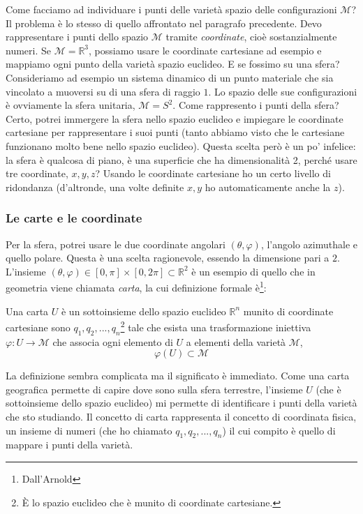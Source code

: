\documentclass[a4paper,openany]{article}
\begin{document}
	Come facciamo ad individuare i punti delle varietà spazio delle configurazioni $\mathcal{M}$? Il problema è lo stesso di quello affrontato nel paragrafo precedente. Devo rappresentare i punti dello spazio $\mathcal{M}$ tramite \textit{coordinate}, cioè sostanzialmente numeri. Se $\mathcal{M} = \mathbb{R}^3$, possiamo usare le coordinate cartesiane ad esempio e mappiamo ogni punto della varietà spazio euclideo. E se fossimo su una sfera? Consideriamo ad esempio un sistema dinamico di un punto materiale che sia vincolato a muoversi su di una sfera di raggio $1$. Lo spazio delle sue configurazioni è ovviamente la sfera unitaria, $\mathcal{M} = S^2$. Come rappresento i punti della sfera? Certo, potrei immergere la sfera nello spazio euclideo e impiegare le coordinate cartesiane per rappresentare i suoi punti (tanto abbiamo visto che le cartesiane funzionano molto bene nello spazio euclideo). Questa scelta però è un po' infelice: la sfera è qualcosa di piano, è una superficie che ha dimensionalità 2, perché usare tre coordinate, $x,y,z$? Usando le coordinate cartesiane ho un certo livello di ridondanza (d'altronde, una volte definite $x,y$ ho automaticamente anche la $z$).
	\subsubsection{Le carte e le coordinate}
	Per la sfera, potrei usare le due coordinate angolari $(\theta,\varphi)$, l'angolo azimuthale e quello polare. Questa è una scelta ragionevole, essendo la dimensione pari a $2$. L'insieme $(\theta,\varphi)\in[0,\pi]\times[0,2\pi]\subset \mathbb{R}^2$ è un esempio di quello che in geometria viene chiamata \textit{carta}, la cui definizione formale è\footnote{Dall'Arnold}:
	\begin{tcolorbox}
		Una carta $U$ è un sottoinsieme dello spazio euclideo $\mathbb{R}^n$ munito di coordinate cartesiane sono $q_1,q_2, ..., q_n$\footnote{È lo spazio euclideo che è munito di coordinate cartesiane.} tale che esista una trasformazione iniettiva $\varphi : U \to \mathcal{M}$ che associa ogni elemento di $U$ a elementi della varietà $\mathcal{M}$,
		$$
		\varphi(U)\subset \mathcal{M}
		$$
	\end{tcolorbox}
	La definizione sembra complicata ma il significato è immediato. Come una carta geografica permette di capire dove sono sulla sfera terrestre, l'insieme $U$ (che è sottoinsieme dello spazio euclideo) mi permette di identificare i punti della varietà che sto studiando. Il concetto di carta rappresenta il concetto di coordinata fisica, un insieme di numeri (che ho chiamato $q_1, q_2, ..., q_n$) il cui compito è quello di mappare i punti della varietà. 
	
\end{document}
